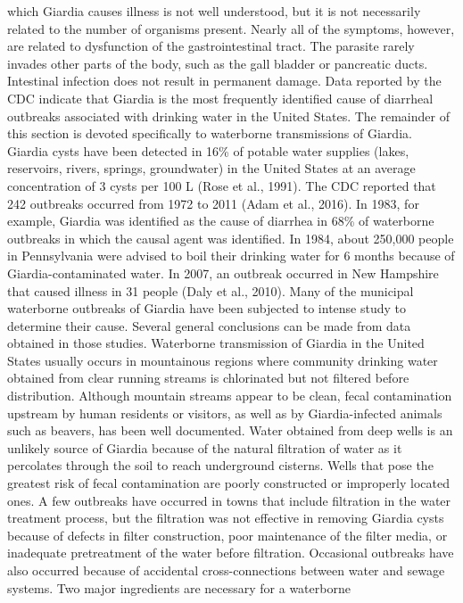\documentclass{article}
\begin{document}
which Giardia causes illness is not well understood, but it is not
necessarily related to the number of organisms present. Nearly all of
the symptoms, however, are related to dysfunction of the
gastrointestinal tract. The parasite rarely invades other parts of the
body, such as the gall bladder or pancreatic ducts. Intestinal infection
does not result in permanent damage. Data reported by the CDC indicate
that Giardia is the most frequently identified cause of diarrheal
outbreaks associated with drinking water in the United States. The
remainder of this section is devoted specifically to waterborne
transmissions of Giardia. Giardia cysts have been detected in 16\% of
potable water supplies (lakes, reservoirs, rivers, springs, groundwater)
in the United States at an average concentration of 3 cysts per 100 L
(Rose et al., 1991). The CDC reported that 242 outbreaks occurred from
1972 to 2011 (Adam et al., 2016). In 1983, for example, Giardia was
identified as the cause of diarrhea in 68\% of waterborne outbreaks in
which the causal agent was identified. In 1984, about 250,000 people in
Pennsylvania were advised to boil their drinking water for 6 months
because of Giardia-contaminated water. In 2007, an outbreak occurred in
New Hampshire that caused illness in 31 people (Daly et al., 2010). Many
of the municipal waterborne outbreaks of Giardia have been subjected to
intense study to determine their cause. Several general conclusions can
be made from data obtained in those studies. Waterborne transmission of
Giardia in the United States usually occurs in mountainous regions where
community drinking water obtained from clear running streams is
chlorinated but not filtered before distribution. Although mountain
streams appear to be clean, fecal contamination upstream by human
residents or visitors, as well as by Giardia-infected animals such as
beavers, has been well documented. Water obtained from deep wells is an
unlikely source of Giardia because of the natural filtration of water as
it percolates through the soil to reach underground cisterns. Wells that
pose the greatest risk of fecal contamination are poorly constructed or
improperly located ones. A few outbreaks have occurred in towns that
include filtration in the water treatment process, but the filtration
was not effective in removing Giardia cysts because of defects in filter
construction, poor maintenance of the filter media, or inadequate
pretreatment of the water before filtration. Occasional outbreaks have
also occurred because of accidental cross-connections between water and
sewage systems. Two major ingredients are necessary for a waterborne
\end{document}
